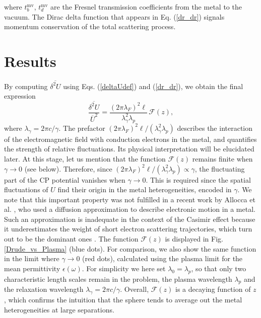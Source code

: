 \documentclass[doublecol]{epl2}
\begin{document}
where $t_b^\text{mv}$, $t_d^\text{mv}$ are the Fresnel transmission coefficients from the metal to the vacuum. The Dirac delta function that appears in Eq. (\ref{dr_dr}) signals momentum conservation of the total scattering process.

\section{Results}

By computing $\overline{\delta^2U}$ using Eqs. (\ref{deltaUdef}) and (\ref{dr_dr}), we obtain the final expression
\begin{equation}
\frac{\overline{\delta^2U}}{\overline{U}^2}=
\frac{(2\pi\lambda_F)^2\ell}{\lambda_\gamma^2\lambda_p}\, \mathcal{F}(z),
\label{deltaU_U}
\end{equation}
where $\lambda_\gamma=2\pi c/\gamma$.
The prefactor $(2\pi\lambda_F)^2\ell/(\lambda_\gamma^2\lambda_p)$ describes the interaction of the electromagnetic field with conduction electrons in the metal, and quantifies the strength of relative fluctuations. Its physical interpretation will be elucidated later. At this stage, let us mention that the function $\mathcal{F}(z)$ remains finite when $\gamma\to 0$ (see below). Therefore, since $(2\pi\lambda_F)^2\ell/(\lambda_\gamma^2\lambda_p) \propto \gamma$, the fluctuating part of the CP potential vanishes when $\gamma\to 0$. This is required since the spatial fluctuations of $U$ find their origin in the metal heterogeneities, encoded in $\gamma$.  
We note that this important property was not fulfilled in a recent work by Allocca et al. \cite{Allocca15}, who used a diffusion approximation to describe electronic motion in a metal. Such an approximation is inadequate in the context of the Casimir effect because it underestimates the weight of short electron scattering trajectories, which turn out to be the dominant ones \cite{Cherroret15}. The function $\mathcal{F}(z)$ is displayed in Fig. \ref{Drude_vs_Plasma} (blue dots). For comparison, we also show the same function in the limit where $\gamma\to 0$ (red dots), calculated using the plasma limit for the mean permittivity $\epsilon(\omega)$.
For simplicity we here set $\lambda_0=\lambda_p$, so that only two characteristic length scales remain in the problem, the plasma wavelength $\lambda_p$ and the relaxation wavelength $\lambda_\gamma=2\pi c/\gamma$. 
Overall, $\mathcal{F}(z)$ is a decaying function of $z$, which  confirms the intuition that the sphere tends to average out the metal heterogeneities at large separations.
\end{document}

